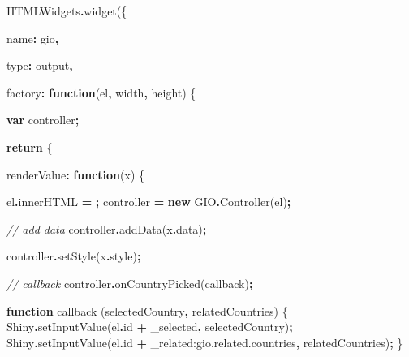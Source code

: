 \documentclass[
]{krantz}
\makeatletter
\newenvironment{Shaded}{\begin{snugshade}}{\end{snugshade}}
\newcommand{\AttributeTok}[1]{\textcolor[rgb]{0.61,0.61,0.61}{#1}}
\newcommand{\CommentTok}[1]{\textcolor[rgb]{0.37,0.37,0.37}{\textit{#1}}}
\newcommand{\ControlFlowTok}[1]{\textcolor[rgb]{0.27,0.27,0.27}{\textbf{#1}}}
\newcommand{\DataTypeTok}[1]{\textcolor[rgb]{0.27,0.27,0.27}{#1}}
\newcommand{\FunctionTok}[1]{\textcolor[rgb]{0,0,0}{#1}}
\newcommand{\KeywordTok}[1]{\textcolor[rgb]{0.27,0.27,0.27}{\textbf{#1}}}
\newcommand{\NormalTok}[1]{#1}
\newcommand{\OperatorTok}[1]{\textcolor[rgb]{0.43,0.43,0.43}{\textbf{#1}}}
\newcommand{\StringTok}[1]{\textcolor[rgb]{0.5,0.5,0.5}{#1}}
\newenvironment{kframe}{%
\medskip{}
\setlength{\fboxsep}{.8em}
 \def\at@end@of@kframe{}%
 \ifinner\ifhmode%
  \def\at@end@of@kframe{\end{minipage}}%
  \begin{minipage}{\columnwidth}%
 \fi\fi%
 \def\FrameCommand##1{\hskip\@totalleftmargin \hskip-\fboxsep
 \colorbox{shadecolor}{##1}\hskip-\fboxsep
     \hskip-\linewidth \hskip-\@totalleftmargin \hskip\columnwidth}%
 \MakeFramed {\advance\hsize-\width
   \@totalleftmargin\z@ \linewidth\hsize
   \@setminipage}}%
 {\par\unskip\endMakeFramed%
 \at@end@of@kframe}
\renewenvironment{Shaded}{\begin{kframe}}{\end{kframe}}
\makeatother
\begin{document}
\begin{Shaded}
\begin{Highlighting}[]
\NormalTok{HTMLWidgets}\OperatorTok{.}\FunctionTok{widget}\NormalTok{(\{}

  \DataTypeTok{name}\OperatorTok{:} \StringTok{\textquotesingle{}gio\textquotesingle{}}\OperatorTok{,}

  \DataTypeTok{type}\OperatorTok{:} \StringTok{\textquotesingle{}output\textquotesingle{}}\OperatorTok{,}

  \DataTypeTok{factory}\OperatorTok{:} \KeywordTok{function}\NormalTok{(el}\OperatorTok{,}\NormalTok{ width}\OperatorTok{,}\NormalTok{ height) \{}

    \KeywordTok{var}\NormalTok{ controller}\OperatorTok{;}

    \ControlFlowTok{return}\NormalTok{ \{}

      \DataTypeTok{renderValue}\OperatorTok{:} \KeywordTok{function}\NormalTok{(x) \{}

\NormalTok{        el}\OperatorTok{.}\AttributeTok{innerHTML} \OperatorTok{=} \StringTok{\textquotesingle{}\textquotesingle{}}\OperatorTok{;}
\NormalTok{        controller }\OperatorTok{=} \KeywordTok{new}\NormalTok{ GIO}\OperatorTok{.}\FunctionTok{Controller}\NormalTok{(el)}\OperatorTok{;}
        
        \CommentTok{// add data}
\NormalTok{        controller}\OperatorTok{.}\FunctionTok{addData}\NormalTok{(x}\OperatorTok{.}\AttributeTok{data}\NormalTok{)}\OperatorTok{;}

\NormalTok{        controller}\OperatorTok{.}\FunctionTok{setStyle}\NormalTok{(x}\OperatorTok{.}\AttributeTok{style}\NormalTok{)}\OperatorTok{;}

        \CommentTok{// callback}
\NormalTok{        controller}\OperatorTok{.}\FunctionTok{onCountryPicked}\NormalTok{(callback)}\OperatorTok{;}

        \KeywordTok{function}\NormalTok{ callback (selectedCountry}\OperatorTok{,}\NormalTok{ relatedCountries) \{}
\NormalTok{          Shiny}\OperatorTok{.}\FunctionTok{setInputValue}\NormalTok{(el}\OperatorTok{.}\AttributeTok{id} \OperatorTok{+} \StringTok{\textquotesingle{}\_selected\textquotesingle{}}\OperatorTok{,}\NormalTok{ selectedCountry)}\OperatorTok{;}
\NormalTok{          Shiny}\OperatorTok{.}\FunctionTok{setInputValue}\NormalTok{(el}\OperatorTok{.}\AttributeTok{id} \OperatorTok{+} \StringTok{\textquotesingle{}\_related:gio.related.countries\textquotesingle{}}\OperatorTok{,}\NormalTok{ relatedCountries)}\OperatorTok{;}
\NormalTok{        \}}


\end{Highlighting}
\end{Shaded}
\end{document}
